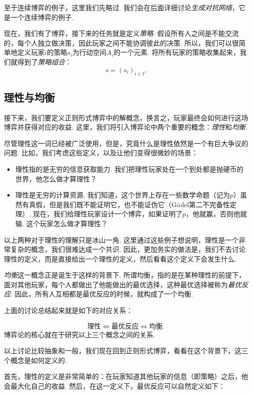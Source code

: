 至于连续博弈的例子，这里我们先略过. 我们会在后面详细讨论\textit{生成对抗网络}，它是一个连续博弈的例子.

现在，我们有了博弈，接下来的任务就是定义\textit{策略}. 假设所有人之间是不能交流的，每个人独立做决策，因此玩家之间不能协调彼此的决策. 所以，我们可以很简单地定义玩家$i$的策略$s_i$为行动空间$A_i$的一个元素. 将所有玩家的策略收集起来，我们就得到了\textit{策略组合}：
\[
s=(s_i)_{i\in I}.
\]

\subsection{理性与均衡}

接下来，我们要定义正则形式博弈中的解概念，换言之，玩家最终会如何进行这场博弈并获得对应的收益. 这里，我们将引入博弈论中两个重要的概念：\textit{理性}和\textit{均衡}. 

尽管理性这一词已经被广泛使用，但是，究竟什么是理性依然是一个有巨大争议的问题. 比如，我们考虑这些定义，以及让他们变得很微妙的场景：
\begin{itemize}
    \item 理性指的是无穷的信息获取能力. 我们把理性玩家处在一个到处都是抛硬币的世界，他怎么做才算理性？
    \item 理性是无穷的计算资源. 我们知道，这个世界上存在一些数学命题（记为$p$）虽然有真假，但是我们既不能证明它，也不能证伪它（Gödel第二不完备性定理）. 现在，我们给理性玩家设计一个博弈，如果证明了$p$，他就赢，否则他就输. 这个玩家怎么做才算理性？
\end{itemize}

以上两种对于理性的理解只是冰山一角. 这里通过这些例子想说明，理性是一个非常复杂的概念，我们很难达成一个共识. 因此，更加务实的做法是，我们不去讨论理性的定义，而是直接给出一个理性的定义，然后看看这个定义下会发生什么.

\textit{均衡}这一概念正是诞生于这样的背景下. 所谓均衡，指的是在某种理性的前提下，面对其他玩家，每个人都做出了他能做出的最优选择，这种最优选择被称为\textit{最优反应}. 因此，所有人互相都是最优反应的时候，就构成了一个均衡.

上面的讨论总结起来就是如下的对应关系：

\[
\text{理性}\iff\text{最优反应}\iff\text{均衡}.
\]
博弈论的核心就在于研究以上三个概念之间的关系.

以上讨论比较抽象和一般，我们现在回到正则形式博弈，看看在这个背景下，这三个概念是如何定义的.

首先，理性的定义是非常简单的：在玩家知道其他玩家的信息（即策略）之后，他会最大化自己的收益. 然后，在这一定义下，最优反应可以自然定义如下：

